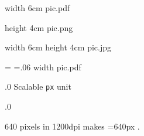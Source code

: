 \pdfximage width 6cm {pic.pdf}  %
\pdfrefximage \pdflastximage    %

\pdfximage height 4cm {pic.png} %

\edef\MyImg{\the\pdflastximage} %
\pdfrefximage\MyImg

\pdfximage width 6cm height 4cm %
   {pic.jpg}                    %

=\hbox{\pdfrefximage\pdflastximage} %
=.06         %
\pdfximage              %
    width  {pic.pdf}  %
\pdfrefximage \pdflastximage



.0 {Scalable {\tt px} unit}

.0
 \pdfpxdimen=0.06bp %
\else
\fi

640 pixels in 1200dpi makes =640px \the{}.

\endfeature



\newpage

